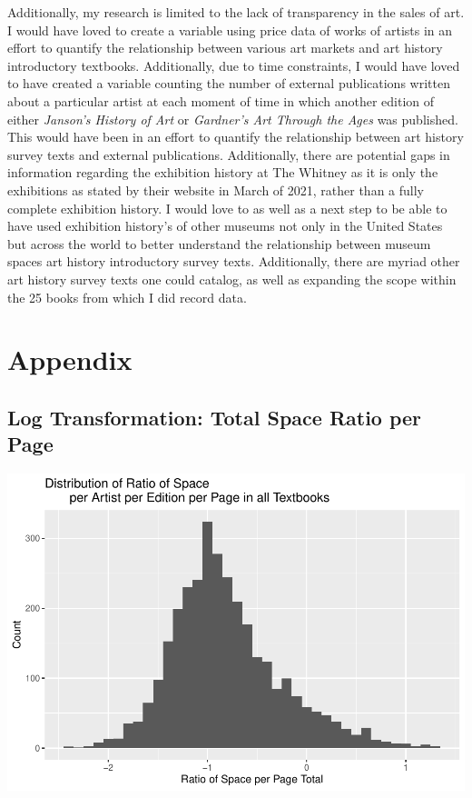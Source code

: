 \documentclass[
  letterpaper,
  DIV=11,
  numbers=noendperiod]{scrreprt}
\begin{document}
Additionally, my research is limited to the lack of transparency in the
sales of art. I would have loved to create a variable using price data
of works of artists in an effort to quantify the relationship between
various art markets and art history introductory textbooks.
Additionally, due to time constraints, I would have loved to have
created a variable counting the number of external publications written
about a particular artist at each moment of time in which another
edition of either \emph{Janson's History of Art} or \emph{Gardner's Art
Through the Ages} was published. This would have been in an effort to
quantify the relationship between art history survey texts and external
publications. Additionally, there are potential gaps in information
regarding the exhibition history at The Whitney as it is only the
exhibitions as stated by their website in March of 2021, rather than a
fully complete exhibition history. I would love to as well as a next
step to be able to have used exhibition history's of other museums not
only in the United States but across the world to better understand the
relationship between museum spaces art history introductory survey
texts. Additionally, there are myriad other art history survey texts one
could catalog, as well as expanding the scope within the 25 books from
which I did record data.

\hypertarget{appendix}{%
\chapter{Appendix}\label{appendix}}

\hypertarget{log-transformation-total-space-ratio-per-page}{%
\section{Log Transformation: Total Space Ratio per
Page}\label{log-transformation-total-space-ratio-per-page}}

\includegraphics{Chapter1/Chapter1_files/figure-pdf/logspaceratioperpagetotal-1.pdf}
\end{document}
